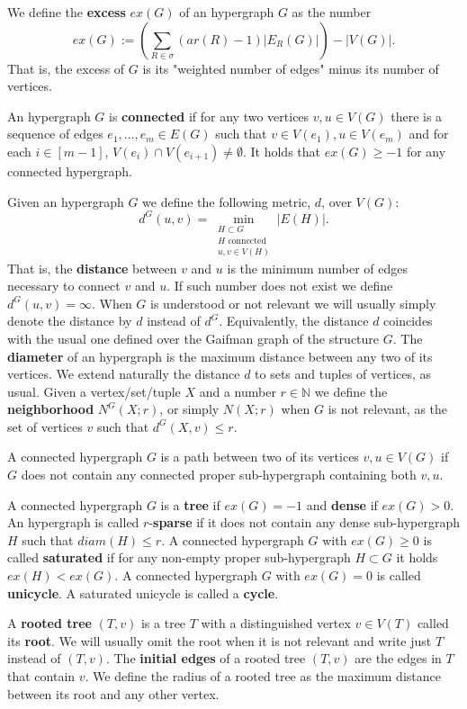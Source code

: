 \documentclass[12pt,notitlepage,a4paper]{article}
\theoremstyle{definition}
\newcommand{\N}{\mathbb{N}}
\begin{document}
We define the \textbf{excess} $ex(G)$ of an hypergraph $G$ as the number
\[
ex(G):= \left(\sum_{R\in \sigma} (ar(R)-1)|E_R(G)|\right) - |V(G)|.  
\] 
That is, the excess of $G$ is its "weighted number of edges"
minus its number of vertices. \par
An hypergraph $G$ is \textbf{connected} if for any two vertices $v,u\in V(G)$
there is a sequence of edges $e_1,\dots, e_m\in E(G)$ such that
$v\in V(e_1), u\in V(e_m)$ and for each $i\in [m-1]$, 
$V(e_i)\cap V(e_{i+1})\neq \emptyset$. It holds that
$ex(G)\geq -1$ for any connected hypergraph.
\par
Given an hypergraph $G$ we define the following metric, $d$, over $V(G)$:
\[ d^G(u,v)= \min_{\substack{H \subset G\\ 
		H \text{ connected }\\
		u,v\in V(H)}} |E(H)| .\]
That is, the \textbf{distance} between $v$ and $u$ is the minimum number of
edges necessary to connect $v$ and $u$. 
If such number does not exist we define $d^G(u,v)=\infty$. 
When $G$ 
is understood or not relevant we will usually simply denote the 
distance by $d$ instead of $d^G$. Equivalently, the distance $d$
coincides with the usual one defined over the Gaifman graph of the structure 
$G$. The \textbf{diameter} of an hypergraph is the maximum distance between any 
two of its vertices. 
We extend naturally the distance $d$ to sets and tuples of
vertices, as usual. Given a vertex/set/tuple $X$ and a number
$r\in \N$ we define the \textbf{neighborhood}
$N^G(X;r)$, or simply $N(X;r)$ when $G$ is not relevant,
as the set of vertices $v$ such that $d^G(X,v)\leq r$.
\par
A connected hypergraph $G$ is a path between two of its 
vertices $v,u\in V(G)$ if $G$ 
does not contain any connected proper sub-hypergraph containing both $v,u$.
\par
A connected hypergraph $G$ is a \textbf{tree} if $ex(G)=-1$ and \textbf{dense} if $ex(G)>0$.
An hypergraph is called $r$-\textbf{sparse} if it does not contain any dense sub-hypergraph $H$
such that $diam(H)\leq r$.
A connected hypergraph $G$ with $ex(G)\geq 0$ is called \textbf{saturated} 
if for any non-empty proper sub-hypergraph
$H\subset G$ it holds $ex(H)<ex(G)$. 
A connected hypergraph $G$ with $ex(G)=0$ is called \textbf{unicycle}. 
A saturated unicycle is called a \textbf{cycle}. \par
A \textbf{rooted tree} $(T,v)$ is a tree $T$ with a 
distinguished vertex $v\in V(T)$ called its \textbf{root}.
We will usually omit the root when it is not relevant and 
write just $T$ instead of $(T,v)$. The
\textbf{initial edges} of a rooted tree $(T,v)$ are 
the edges in $T$ that contain $v$. 
We define the radius of a rooted tree
as the maximum distance between its root
and any other vertex.
\par
\end{document}
